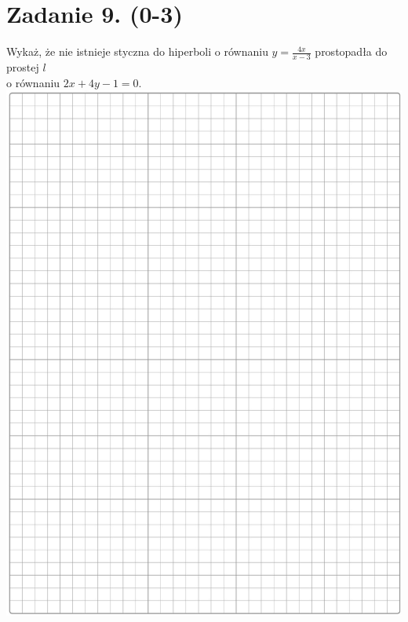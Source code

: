 \documentclass[10pt]{article}
\begin{document}
\section*{Zadanie 9. (0-3)}
Wykaż, że nie istnieje styczna do hiperboli o równaniu \(y=\frac{4 x}{x-3}\) prostopadła do prostej \(l\)\\
o równaniu \(2 x+4 y-1=0\).\\
\includegraphics[max width=\textwidth, center]{2024_11_21_06df787f12c5337a1fe8g-06}
\end{document}
